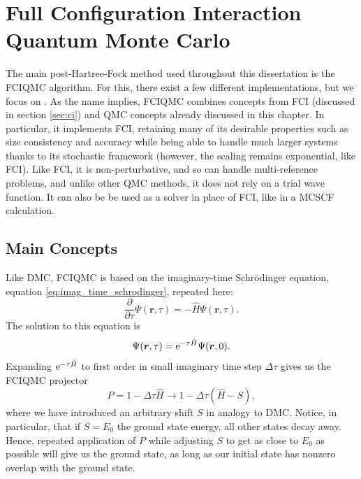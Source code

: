 \section{Full Configuration Interaction Quantum Monte Carlo}
\label{sec:fciqmc}

The main post-Hartree-Fock method used throughout this dissertation is the \gls{FCIQMC} algorithm.\supercite{booth_fciqmc_2009} For this, there exist a few different implementations,\cite{Guther_neci_2020,spencerHANDEQMC2019b,brandRimujl2024,andersonRobertanderson2024} but we focus on \neci.\cite{Guther_neci_2020} As the name implies, \gls{FCIQMC} combines concepts from \gls{FCI} (discussed in section \ref{sec:ci}) and \gls{QMC} concepts already discussed in this chapter. In particular, it implements FCI, retaining many of its desirable properties such as size consistency and accuracy while being able to handle much larger systems thanks to its stochastic framework (however, the scaling remains exponential, like FCI). Like FCI, it is non-perturbative, and so can handle multi-reference problems, and unlike other QMC methods, it does not rely on a trial wave function. It can also be be used as a solver in place of FCI, like in a \gls{MCSCF} calculation.\supercite{dobrautzSpinPure2021,weserStochastic2022}

\subsection{Main Concepts}

Like \gls{DMC}, \gls{FCIQMC} is based on the imaginary-time Schr\"odinger equation, equation \ref{eq:imag_time_schrodinger}, repeated here:
\begin{equation}
    \frac{\partial}{\partial\tau}\Psi(\bm r, \tau) = -\hat H\Psi(\bm r, \tau).
\end{equation}
The solution to this equation is
\begin{equation}
    \Psi(\bm r, \tau) = \mathrm{e}^{-\tau\hat H}\Psi(\bm r, 0).
\end{equation}
Expanding $\mathrm{e}^{-\tau\hat H}$ to first order in small imaginary time step $\Delta\tau$ gives us the FCIQMC projector
\begin{equation}
    \label{eq:fciqmc_projector}
    P = 1-\Delta\tau\hat H \to 1-\Delta\tau(\hat H - S),
\end{equation}
where we have introduced an arbitrary shift $S$ in analogy to \gls{DMC}. Notice, in particular, that if $S=E_0$ the ground state energy, all other states decay away. Hence, repeated application of $P$ while adjusting $S$ to get as close to $E_0$ as possible will give us the ground state, as long as our initial state has nonzero overlap with the ground state.

